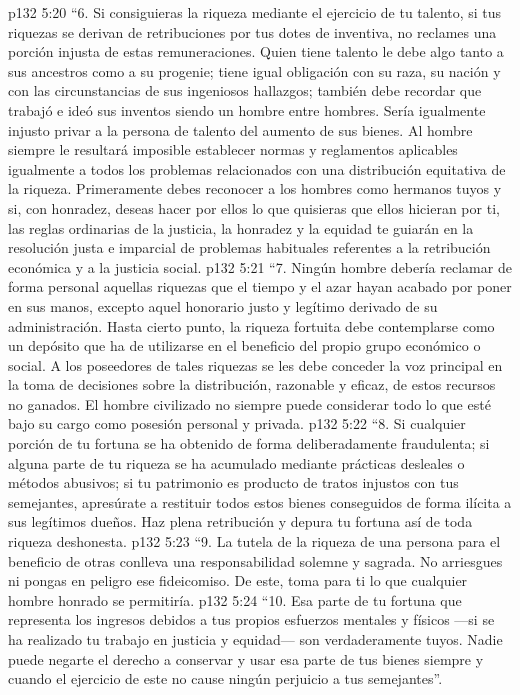 \vs p132 5:20 \pc “6. Si consiguieras la riqueza mediante el ejercicio de tu talento, si tus riquezas se derivan de retribuciones por tus dotes de inventiva, no reclames una porción injusta de estas remuneraciones. Quien tiene talento le debe algo tanto a sus ancestros como a su progenie; tiene igual obligación con su raza, su nación y con las circunstancias de sus ingeniosos hallazgos; también debe recordar que trabajó e ideó sus inventos siendo un hombre entre hombres. Sería igualmente injusto privar a la persona de talento del aumento de sus bienes. Al hombre siempre le resultará imposible establecer normas y reglamentos aplicables igualmente a todos los problemas relacionados con una distribución equitativa de la riqueza. Primeramente debes reconocer a los hombres como hermanos tuyos y si, con honradez, deseas hacer por ellos lo que quisieras que ellos hicieran por ti, las reglas ordinarias de la justicia, la honradez y la equidad te guiarán en la resolución justa e imparcial de problemas habituales referentes a la retribución económica y a la justicia social.
\vs p132 5:21 \pc “7. Ningún hombre debería reclamar de forma personal aquellas riquezas que el tiempo y el azar hayan acabado por poner en sus manos, excepto aquel honorario justo y legítimo derivado de su administración. Hasta cierto punto, la riqueza fortuita debe contemplarse como un depósito que ha de utilizarse en el beneficio del propio grupo económico o social. A los poseedores de tales riquezas se les debe conceder la voz principal en la toma de decisiones sobre la distribución, razonable y eficaz, de estos recursos no ganados. El hombre civilizado no siempre puede considerar todo lo que esté bajo su cargo como posesión personal y privada.
\vs p132 5:22 \pc “8. Si cualquier porción de tu fortuna se ha obtenido de forma deliberadamente fraudulenta; si alguna parte de tu riqueza se ha acumulado mediante prácticas desleales o métodos abusivos; si tu patrimonio es producto de tratos injustos con tus semejantes, apresúrate a restituir todos estos bienes conseguidos de forma ilícita a sus legítimos dueños. Haz plena retribución y depura tu fortuna así de toda riqueza deshonesta.
\vs p132 5:23 \pc “9. La tutela de la riqueza de una persona para el beneficio de otras conlleva una responsabilidad solemne y sagrada. No arriesgues ni pongas en peligro ese fideicomiso. De este, toma para ti lo que cualquier hombre honrado se permitiría.
\vs p132 5:24 \pc “10. Esa parte de tu fortuna que representa los ingresos debidos a tus propios esfuerzos mentales y físicos ---si se ha realizado tu trabajo en justicia y equidad--- son verdaderamente tuyos. Nadie puede negarte el derecho a conservar y usar esa parte de tus bienes siempre y cuando el ejercicio de este no cause ningún perjuicio a tus semejantes”.
